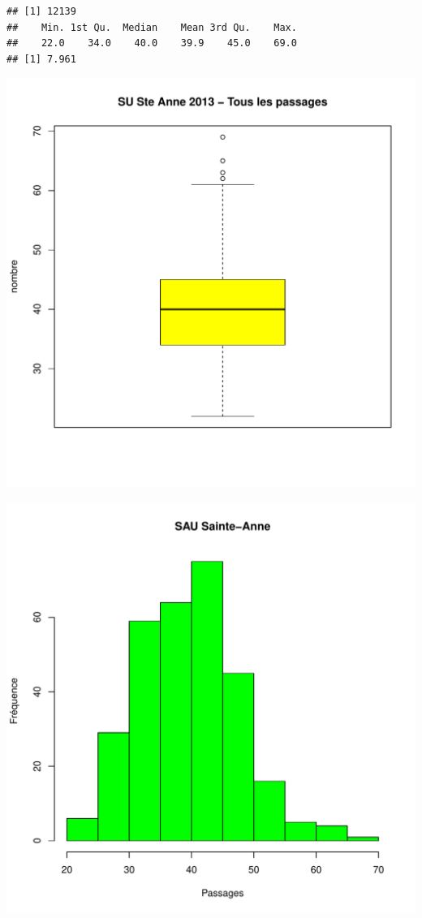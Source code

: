 \documentclass[12pt,english,french,twoside]{report}\usepackage[]{graphicx}\usepackage[]{color}
\makeatletter
\def\maxwidth{ %
  \ifdim\Gin@nat@width>\linewidth
    \linewidth
  \else
    \Gin@nat@width
  \fi
}
\newenvironment{kframe}{%
 \def\at@end@of@kframe{}%
 \ifinner\ifhmode%
  \def\at@end@of@kframe{\end{minipage}}%
  \begin{minipage}{\columnwidth}%
 \fi\fi%
 \def\FrameCommand##1{\hskip\@totalleftmargin \hskip-\fboxsep
 \colorbox{shadecolor}{##1}\hskip-\fboxsep
     \hskip-\linewidth \hskip-\@totalleftmargin \hskip\columnwidth}%
 \MakeFramed {\advance\hsize-\width
   \@totalleftmargin\z@ \linewidth\hsize
   \@setminipage}}%
 {\par\unskip\endMakeFramed%
 \at@end@of@kframe}
\newenvironment{knitrout}{}{} %
\makeatother
\begin{document}
\begin{knitrout}
\color{fgcolor}\begin{kframe}
\begin{verbatim}
## [1] 12139
##    Min. 1st Qu.  Median    Mean 3rd Qu.    Max. 
##    22.0    34.0    40.0    39.9    45.0    69.0
## [1] 7.961
\end{verbatim}
\end{kframe}
\includegraphics[width=\maxwidth]{figure/stAnne_tot_passages1} 

\includegraphics[width=\maxwidth]{figure/stAnne_tot_passages2} 

\end{knitrout}
\end{document}
